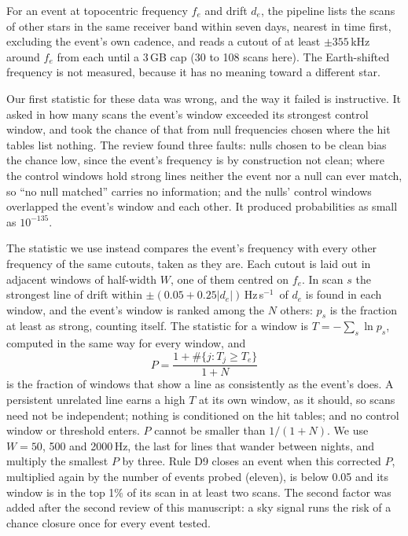 \documentclass[twocolumn]{aastex631}
\newcommand{\hzs}{Hz\,s$^{-1}$}
\begin{document}
For an event at topocentric frequency $f_e$ and drift $d_e$, the pipeline
lists the scans of other stars in the same receiver band within seven days,
nearest in time first, excluding the event's own cadence, and reads a cutout
of at least $\pm355$\,kHz around $f_e$ from each until a 3\,GB cap (30 to
108 scans here). The Earth-shifted frequency is not measured, because it
has no meaning toward a different star.

Our first statistic for these data was wrong, and the way it failed is
instructive. It asked in how many scans the event's window exceeded its
strongest control window, and took the chance of that from null frequencies
chosen where the hit tables list nothing. The review found three faults:
nulls chosen to be clean bias the chance low, since the event's frequency
is by construction not clean; where the control windows hold strong lines
neither the event nor a null can ever match, so ``no null matched'' carries
no information; and the nulls' control windows overlapped the event's
window and each other. It produced probabilities as small as $10^{-135}$.

The statistic we use instead compares the event's frequency with every
other frequency of the same cutouts, taken as they are. Each cutout is laid
out in adjacent windows of half-width $W$, one of them centred on $f_e$. In
scan $s$ the strongest line of drift within $\pm(0.05+0.25|d_e|)$\,\hzs\ of
$d_e$ is found in each window, and the event's window is ranked among the
$N$ others: $p_s$ is the fraction at least as strong, counting itself. The
statistic for a window is $T=-\sum_s\ln p_s$, computed in the same way for
every window, and
\begin{equation}
P=\frac{1+\#\{j: T_j\ge T_e\}}{1+N}
\end{equation}
is the fraction of windows that show a line as consistently as the event's
does. A persistent unrelated line earns a high $T$ at its own window, as it
should, so scans need not be independent; nothing is conditioned on the hit
tables; and no control window or threshold enters. $P$ cannot be smaller
than $1/(1+N)$. We use $W=50$, 500 and 2000\,Hz, the last for lines that
wander between nights, and multiply the smallest $P$ by three. Rule D9
closes an event when this corrected $P$, multiplied again by the number of
events probed (eleven), is below 0.05 and its window is in the top 1\% of
its scan in at least two scans. The second factor was added after the
second review of this manuscript: a sky signal runs the risk of a chance
closure once for every event tested.
\end{document}
